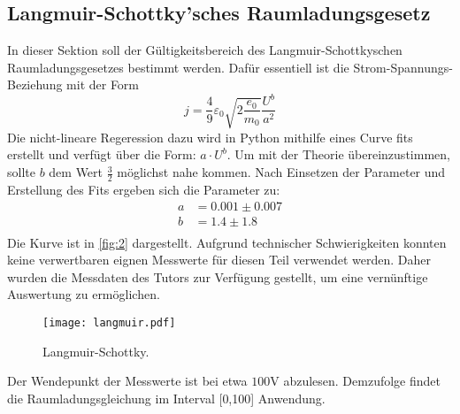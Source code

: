 \subsection{Langmuir-Schottky'sches Raumladungsgesetz}
In dieser Sektion soll der Gültigkeitsbereich des Langmuir-Schottkyschen 
Raumladungsgesetzes bestimmt werden. Dafür essentiell ist die Strom-Spannungs-
Beziehung mit der Form
\begin{equation}
    j = \frac{4}{9} \varepsilon_0 \sqrt{2 \frac{e_0}{m_0}} \frac{U^b}{a^2}
\end{equation}
Die nicht-lineare Regeression dazu wird in Python mithilfe eines Curve fits 
erstellt und verfügt über die Form: $a \cdot U^b$. Um mit der Theorie
übereinzustimmen, sollte $b$ dem Wert $\frac{3}{2}$ möglichst nahe kommen.
Nach Einsetzen der Parameter und Erstellung des Fits ergeben sich die Parameter 
zu:
\begin{align*}
    a &= 0.001 \pm 0.007 \\
    b &= 1.4 \pm 1.8 \\
\end{align*}
Die Kurve ist in \autoref{fig:2} dargestellt. Aufgrund technischer Schwierigkeiten
konnten keine verwertbaren eignen Messwerte für diesen Teil verwendet werden. 
Daher wurden die Messdaten des Tutors zur Verfügung gestellt, um eine vernünftige 
Auswertung zu ermöglichen.
\begin{figure}[H]
    \centering
    \texttt{[image: langmuir.pdf]}
    \caption{Langmuir-Schottky.}
    \label{fig:2}  %
\end{figure}
\noindent Der Wendepunkt der Messwerte ist bei etwa $100 \unit{\volt}$ abzulesen.
Demzufolge findet die Raumladungsgleichung im Interval [0,100] Anwendung.

